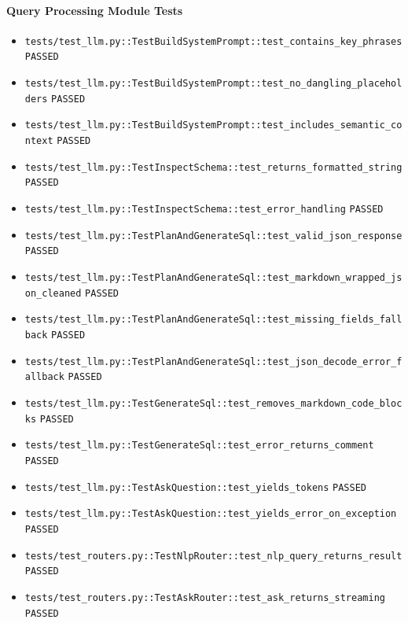 \documentclass[12pt, titlepage]{article}
\begin{document}
\paragraph{Query Processing Module Tests}
{\small
\begin{itemize}[leftmargin=1.5em, itemsep=0.2em, topsep=0.3em]
  \item \nolinkurl{tests/test_llm.py::TestBuildSystemPrompt::test_contains_key_phrases} \texttt{PASSED}
  \item \nolinkurl{tests/test_llm.py::TestBuildSystemPrompt::test_no_dangling_placeholders} \texttt{PASSED}
  \item \nolinkurl{tests/test_llm.py::TestBuildSystemPrompt::test_includes_semantic_context} \texttt{PASSED}
  \item \nolinkurl{tests/test_llm.py::TestInspectSchema::test_returns_formatted_string} \texttt{PASSED}
  \item \nolinkurl{tests/test_llm.py::TestInspectSchema::test_error_handling} \texttt{PASSED}
  \item \nolinkurl{tests/test_llm.py::TestPlanAndGenerateSql::test_valid_json_response} \texttt{PASSED}
  \item \nolinkurl{tests/test_llm.py::TestPlanAndGenerateSql::test_markdown_wrapped_json_cleaned} \texttt{PASSED}
  \item \nolinkurl{tests/test_llm.py::TestPlanAndGenerateSql::test_missing_fields_fallback} \texttt{PASSED}
  \item \nolinkurl{tests/test_llm.py::TestPlanAndGenerateSql::test_json_decode_error_fallback} \texttt{PASSED}
  \item \nolinkurl{tests/test_llm.py::TestGenerateSql::test_removes_markdown_code_blocks} \texttt{PASSED}
  \item \nolinkurl{tests/test_llm.py::TestGenerateSql::test_error_returns_comment} \texttt{PASSED}
  \item \nolinkurl{tests/test_llm.py::TestAskQuestion::test_yields_tokens} \texttt{PASSED}
  \item \nolinkurl{tests/test_llm.py::TestAskQuestion::test_yields_error_on_exception} \texttt{PASSED}
  \item \nolinkurl{tests/test_routers.py::TestNlpRouter::test_nlp_query_returns_result} \texttt{PASSED}
  \item \nolinkurl{tests/test_routers.py::TestAskRouter::test_ask_returns_streaming} \texttt{PASSED}
\end{itemize}
}
\end{document}
